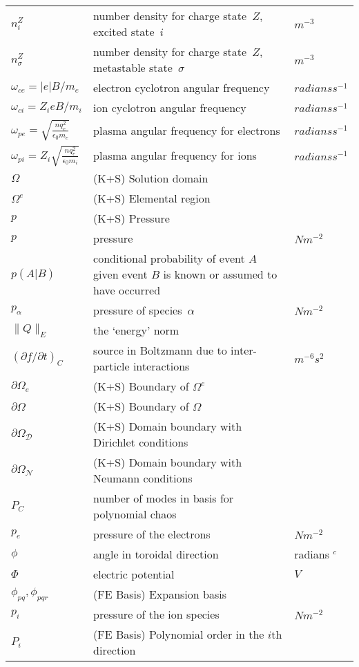 \begin{longtable}{|p{3.0cm}|p{10.0cm}|p{3.0cm}|}
$n^Z_i$ & number density for charge state~$Z$, excited state~$i$  & $m^{-3}$ \\
$n^Z_\sigma$ & number density for charge state~$Z$, metastable state~$\sigma$  & $m^{-3}$ \\
$\omega_{ce}= |e|B/m_e$ & electron cyclotron angular frequency & $radians s^{-1}$ \\
$\omega_{ci}= Z_i e B/m_i$ & ion cyclotron angular frequency & $radians s^{-1}$ \\
$\omega_{pe}= \sqrt{\frac{nq_e^2}{\epsilon_0 m_e}}$ & plasma angular frequency for electrons & $radians s^{-1}$ \\
$\omega_{pi}= Z_i\sqrt{\frac{nq_e^2}{\epsilon_0 m_i}}$ & plasma angular frequency for ions & $radians s^{-1}$ \\
$\Omega$ &  (K+S) Solution domain & \\
$\Omega^e$ &  (K+S) Elemental region & \\
$p$ &  (K+S) Pressure & \\
$p$ & pressure  & $N m^{-2}$ \\
$p(A|B)$ & conditional probability of event $A$ given event $B$ is known or assumed to have occurred  & \\
$p_\alpha$ & pressure of species~$\alpha$  & $N m^{-2}$ \\
$\parallel  Q \parallel_E $ &the `energy' norm  & \\
$(\partial f/\partial t)_C$ & source in Boltzmann due to inter-particle interactions  & $m^{-6} s^2$ \\
$\partial \Omega_e$ &  (K+S) Boundary of $\Omega^e$ & \\
$\partial \Omega$ &  (K+S) Boundary of $\Omega$ & \\
$\partial \Omega_{\mathcal D}$ &  (K+S) Domain boundary with Dirichlet conditions & \\
$\partial \Omega_{\mathcal N}$ &  (K+S) Domain boundary with Neumann conditions & \\
$P_C$ & number of modes in basis for polynomial chaos & \\
$p_e$ & pressure of the electrons  & $N m^{-2}$ \\
$\phi$ & angle in toroidal direction & radians $^c$ \\
$\Phi$ & electric potential  & $V$ \\
$\phi_{pq}, \phi_{pqr}$ &  (FE Basis) Expansion basis & \\
$p_i$ & pressure of the ion species  & $N m^{-2}$ \\
$P_i$ &  (FE Basis) Polynomial order in the $i$th direction & \\

\end{longtable}
